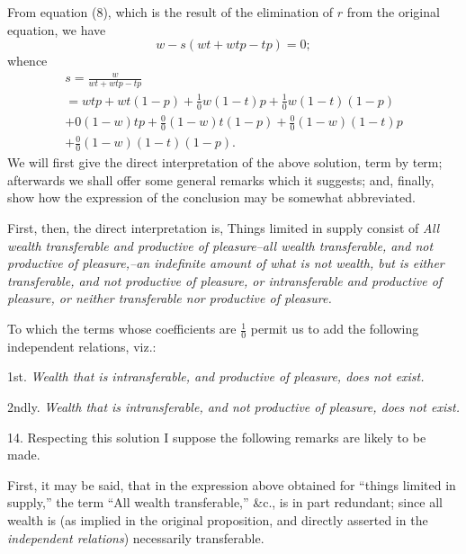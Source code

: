 \documentclass[oneside]{book}
\begin{document}
From equation (8), which is the result of the elimination of
$r$ from the original equation, we have
\[
w - s \left(wt + wtp - tp\right) = 0;
\]
whence
\begin{eqnarray*}
s = \frac{w}{wt + wtp - tp}\\
= wtp + wt\left(1-p\right) + \frac{1}{0} w\left(1-t\right)p + \frac{1}{0}w \left(1-t\right)\left(1-p\right)\\
+ 0 \left(1-w\right) tp + \frac{0}{0} \left(1-w\right) t \left(1-p\right) + \frac{0}{0} \left(1-w\right)\left(1-t\right) p\\
+ \frac{0}{0} \left(1-w\right) \left(1-t\right) \left(1-p\right).
\end{eqnarray*}
We will first give the direct interpretation of the above solution,
term by term; afterwards we shall offer some general remarks
which it suggests; and, finally, show how the expression of the
conclusion may be somewhat abbreviated.

First, then, the direct interpretation is, Things limited in
supply consist of \textit{All wealth transferable and productive of pleasure--all
wealth transferable, and not productive of pleasure,--an indefinite
amount of what is not wealth, but is either transferable, and not
productive of pleasure, or intransferable and productive of pleasure,
or neither transferable nor productive of pleasure.}

To which the terms whose coefficients are $\frac{1}{0}$ permit us to add
the following independent relations, viz.:

1st. \textit{Wealth that is intransferable, and productive of pleasure,
does not exist.}

2ndly. \textit{Wealth that is intransferable, and not productive of pleasure,
does not exist.}

14. Respecting this solution I suppose the following remarks
are likely to be made.

First, it may be said, that in the expression above obtained
for ``things limited in supply,'' the term ``All wealth transferable,''
\&c., is in part redundant; since all wealth is (as implied
in the original proposition, and directly asserted in the \textit{independent
relations}) necessarily transferable.
\end{document}

